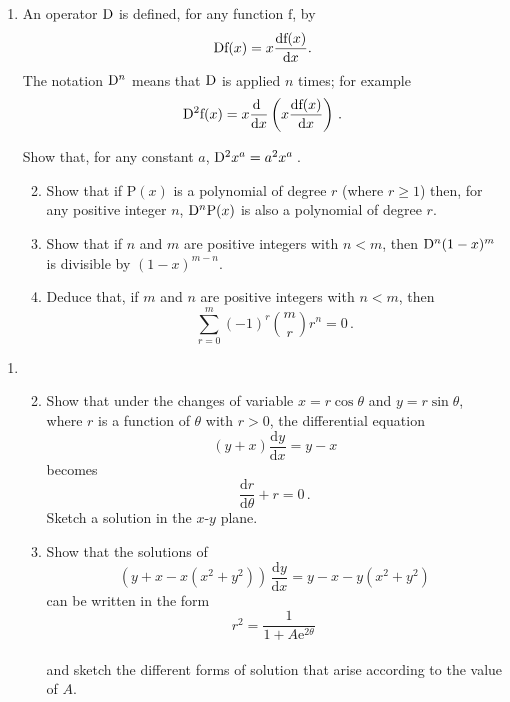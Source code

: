 \documentclass[a4, 11pt]{report}
\newlength{\qspace}
\newcounter{qnumber}
\newenvironment{question}%
 {\vspace{\qspace}
  \begin{enumerate}[\bfseries 1\quad][10]%
    \setcounter{enumi}{\value{qnumber}}%
    \item%
 }
{
  \end{enumerate}
  \filbreak
  \stepcounter{qnumber}
 }
\newenvironment{questionparts}[1][1]%
 {
  \begin{enumerate}[\bfseries (i)]%
    \setcounter{enumii}{#1}
    \addtocounter{enumii}{-1}
    \setlength{\itemsep}{5mm}
    \setlength{\parskip}{8pt}
 }
 {
  \end{enumerate}
 }
\def\d{{\mathrm d}}
\def\e{{\mathrm e}}
\def\f{{\mathrm f}}
\def\P{{\mathrm P}}
\def\ge{\geqslant}
\renewcommand{\.}[1]{\ensuremath{\mathrm{#1}}}
\newcommand{\+}[1]{\ensuremath{\mathbf{#1}}}
\begin{document}
\begin{question}
An operator $\rm D$ is defined, for any function $\f$, by
\[
{\rm D}\f(x) = x\frac{\d\f(x)}{\d x}
.\]
The notation ${\rm D}^n$ means that $\rm D$ is applied $n$ times; for example
\[
\displaystyle
{\rm D}^2\f(x) = x\frac{\d\ }{\d x}\left(  x\frac{\d\f(x)}{\d x} \right)
\,.
\]

Show that, for any constant $a$,  ${\rm D}^2 x^a = a^2 x^a\,$.

\begin{questionparts}
\item Show               that if $\P(x)$ is a polynomial of degree $r$ (where $r\ge1$) then, for any positive integer $n$, ${\rm D}^n\P(x)$ is also a polynomial of degree $r$.

\item Show               that if $n$ and $m$ are  positive integers  with $n<m$, then ${\rm D}^n(1-x)^m$ is divisible by $(1-x)^{m-n}$.
\item Deduce that, if $m$ and $n$ are positive integers with $n<m$, then 
\[
\sum_{r=0}^m (-1)^r \binom m r r^n =0
\, .
\]

\end{questionparts}
\end{question}
		
\begin{question}
\begin{questionparts}
\item Show that under the changes of variable $x= r\cos\theta$ and $y = r\sin\theta$, where $r$ is a function of $\theta$ with $r>0$,  the differential equation
\[
(y+x)\frac{\d y}{\d x} =  y-x
\]
becomes 
\[
\frac{\d r}{\d\theta} +  r=0 \,.
\]
Sketch a solution in the $x$-$y$ plane. 

\item Show that the solutions of 
\[
\left( y+x -x(x^2+y^2) \right) \, \frac{\d y }{\d x} = y-x - y(x^2+y^2)
\]
can be written in the form 
\\
\[
r^2 = \dfrac 1 {1+A\e^{2\theta}}\,
\]\\
and sketch the different forms of solution that arise according to the value of $A$.
\end{questionparts}
\end{question}	
		

		
	
\newpage
\end{document}
